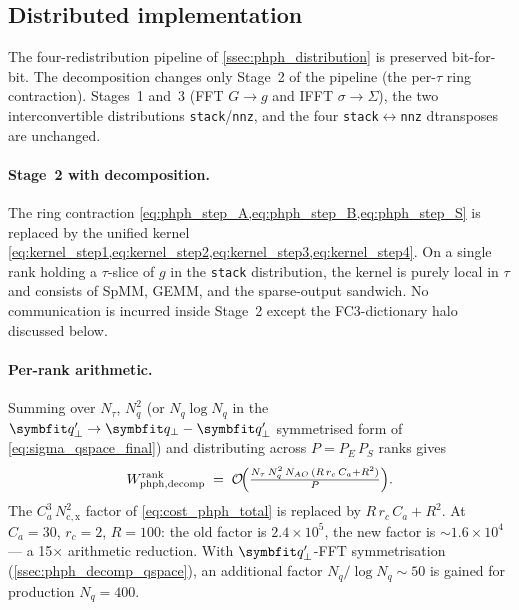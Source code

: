 \subsection{Distributed implementation}
\label{ssec:phph_decomp_dist}

The four-redistribution pipeline of \cref{ssec:phph_distribution} is
preserved bit-for-bit. The decomposition changes only Stage~2 of the
pipeline (the per-$\tau$ ring contraction). Stages~1 and~3
(FFT $G\to g$ and IFFT $\sigma\to\Sigma$), the two interconvertible
distributions \texttt{stack}/\texttt{nnz}, and the four
\texttt{stack}$\leftrightarrow$\texttt{nnz} dtransposes are unchanged.

\paragraph{Stage~2 with decomposition.}
The ring contraction
\cref{eq:phph_step_A,eq:phph_step_B,eq:phph_step_S} is replaced by
the unified kernel
\cref{eq:kernel_step1,eq:kernel_step2,eq:kernel_step3,eq:kernel_step4}.
On a single rank holding a $\tau$-slice of $g$ in the \texttt{stack}
distribution, the kernel is purely local in $\tau$ and consists of
SpMM, GEMM, and the sparse-output sandwich. No communication is
incurred inside Stage~2 except the FC3-dictionary halo discussed
below.

\paragraph{Per-rank arithmetic.}
Summing over $N_\tau$, $N_q^{2}$ (or $N_q\log N_q$ in the
$\qp'\to\qp-\qp'$ symmetrised form of
\cref{eq:sigma_qspace_final}) and distributing across $P=P_E\,P_S$
ranks gives
\begin{equation}\label{eq:cost_phph_dist_cp}
  W^{\mathrm{rank}}_\mathrm{phph,decomp}
  \;=\;
  \mathcal{O}\!\Bigl(
    \tfrac{N_\tau\,N_q^{2}\,N_{AO}\,(R\,r_c\,C_a + R^{2})}{P}
  \Bigr).
\end{equation}
The $C_a^{3}\,N_\mathrm{c,x}^{2}$ factor of \cref{eq:cost_phph_total}
is replaced by $R\,r_c\,C_a + R^{2}$. At $C_a=30$, $r_c=2$, $R=100$:
the old factor is $2.4\times 10^{5}$, the new factor is
$\sim 1.6\times 10^{4}$ --- a 15$\times$ arithmetic reduction. With
$\qp'$-FFT symmetrisation (\cref{ssec:phph_decomp_qspace}), an
additional factor $N_q/\log N_q\sim 50$ is gained for production
$N_q=400$.
 
